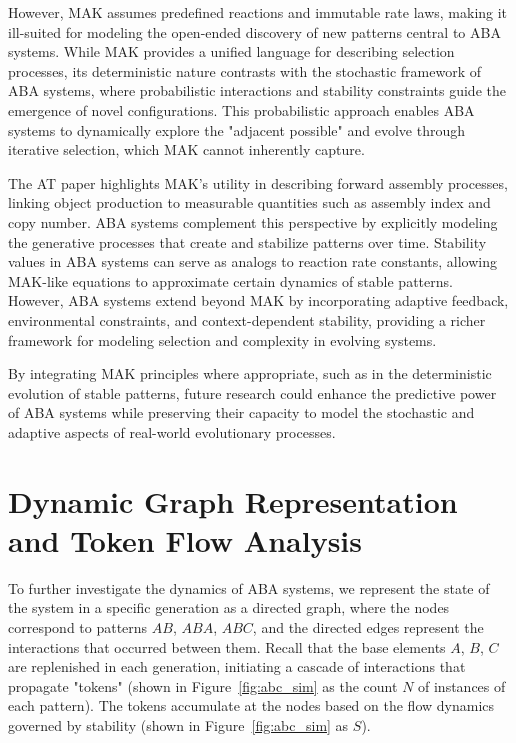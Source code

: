 \documentclass[entropy,article,submit,pdftex,oneauthor]{Definitions/mdpi}
\begin{document}
However, MAK assumes predefined reactions and immutable rate laws, making it ill-suited for modeling the open-ended discovery of new patterns central to ABA systems. While MAK provides a unified language for describing selection processes, its deterministic nature contrasts with the stochastic framework of ABA systems, where probabilistic interactions and stability constraints guide the emergence of novel configurations. This probabilistic approach enables ABA systems to dynamically explore the "adjacent possible" \cite{kauffman1996investigations} and evolve through iterative selection, which MAK cannot inherently capture.

The AT paper \cite{walker2023nature} highlights MAK’s utility in describing forward assembly processes, linking object production to measurable quantities such as assembly index and copy number. ABA systems complement this perspective by explicitly modeling the generative processes that create and stabilize patterns over time. Stability values in ABA systems can serve as analogs to reaction rate constants, allowing MAK-like equations to approximate certain dynamics of stable patterns. However, ABA systems extend beyond MAK by incorporating adaptive feedback, environmental constraints, and context-dependent stability, providing a richer framework for modeling selection and complexity in evolving systems.

By integrating MAK principles where appropriate, such as in the deterministic evolution of stable patterns, future research could enhance the predictive power of ABA systems while preserving their capacity to model the stochastic and adaptive aspects of real-world evolutionary processes.

\section{Dynamic Graph Representation and Token Flow Analysis}

To further investigate the dynamics of ABA systems, we represent the state of the system in a specific generation as a directed graph, where the nodes correspond to patterns $AB$, $ABA$, $ABC$, and the directed edges represent the interactions that occurred between them. Recall that the base elements $A$, $B$, $C$ are replenished in each generation, initiating a cascade of interactions that propagate "tokens" (shown in Figure~\ref{fig:abc_sim} as the count $N$ of instances of each pattern). The tokens accumulate at the nodes based on the flow dynamics governed by stability (shown in Figure~\ref{fig:abc_sim} as $S$).
\end{document}
